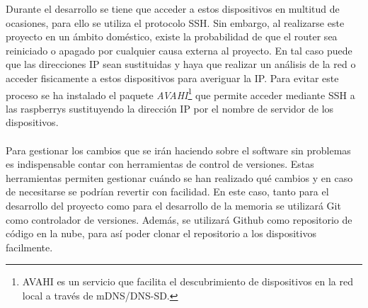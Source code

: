 Durante el desarrollo se tiene que acceder a estos dispositivos en multitud de ocasiones, para ello se utiliza el protocolo SSH. Sin embargo, al realizarse este proyecto en un ámbito doméstico, existe la probabilidad de que el router sea reiniciado o apagado por cualquier causa externa al proyecto. En tal caso puede que las direcciones IP sean sustituidas y haya que realizar un análisis de la red o acceder fisicamente a estos dispositivos para averiguar la IP. Para evitar este proceso se ha instalado el paquete \textit{AVAHI}\footnote{AVAHI es un servicio que facilita el descubrimiento de dispositivos en la red local a través de mDNS/DNS-SD.} que permite acceder mediante SSH a las raspberrys sustituyendo la dirección IP por el nombre de servidor de los dispositivos.
\\ \\
Para gestionar los cambios que se irán haciendo sobre el software sin problemas es indispensable contar con herramientas de control de versiones. Estas herramientas permiten gestionar cuándo se han realizado qué cambios y en caso de necesitarse se podrían revertir con facilidad. En este caso, tanto para el desarrollo del proyecto como para el desarrollo de la memoria se utilizará Git como controlador de versiones. Además, se utilizará Github como repositorio de código en la nube, para así poder clonar el repositorio a los dispositivos facilmente.
